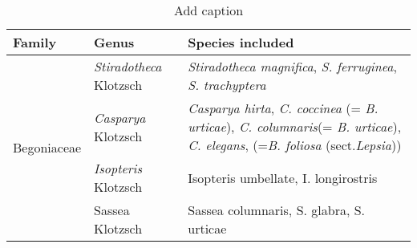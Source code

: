 \begin{table}[htbp]
  \centering
  \caption{Add caption}
    \begin{tabular}{cll}
    \toprule
    \multicolumn{1}{l}{Family} & Genus & Species included \\
    \midrule
    \multirow{4}[8]{*}{Begoniaceae} & \textit{Stiradotheca} Klotzsch & \textit{Stiradotheca magnifica}, \textit{S. ferruginea}, \textit{S. trachyptera} \\
\cmidrule{2-3}          & \textit{Casparya} Klotzsch & \multicolumn{1}{p{37.355em}}{\textit{Casparya hirta}, \textit{C. coccinea} (= \textit{B. urticae}), \textit{C. columnaris}\newline{}(= \textit{B. urticae}), \textit{C. elegans}, (=\textit{B. foliosa} (sect.\newline{}\textit{Lepsia}))} \\
\cmidrule{2-3}          & \textit{Isopteris} Klotzsch & Isopteris umbellate, I. longirostris \\
\cmidrule{2-3}          & Sassea Klotzsch & Sassea columnaris, S. glabra, S. urticae \\
    \bottomrule
    \bottomrule
    \end{tabular}%
  \label{tab:addlabel}%
\end{table}%
